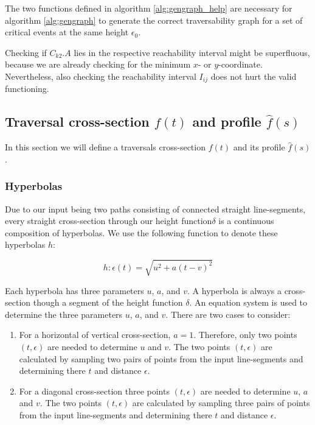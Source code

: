 The two functions defined in algorithm \ref{alg:gengraph_help} are necessary for algorithm \ref{alg:gengraph} to generate the correct traversability graph for a set of critical events at the same height $\epsilon_0$.

Checking if $C_{k2}.A$ lies in the respective reachability interval might be superfluous, because we are already checking for the minimum $x$- or $y$-coordinate. Nevertheless, also checking the reachability interval $I_{ij}$ does not hurt the valid functioning.


\subsection{Traversal cross-section $f(t)$ and profile $\hat{f}(s)$}\label{sec:trav_csp}

In this section we will define a traversals cross-section $f(t)$ and its profile $\hat{f}(s)$.

\subsubsection{Hyperbolas}

Due to our input being two paths consisting of connected straight line-segments, every straight cross-section through our height function$\delta$ is a continuous composition of hyperbolas. We use the following function to denote these hyperbolas $h$:

$$h: \epsilon(t) = \sqrt{u^2 + a(t - v)^2}$$

Each hyperbola has three parameters $u$, $a$, and $v$. A hyperbola is always a cross-section though a segment of the height function $\delta$. An equation system is used to determine the three parameters $u$, $a$, and $v$. There are two cases to consider:

\begin{enumerate}
	\item For a horizontal of vertical cross-section, $a = 1$. Therefore, only two points $(t, \epsilon)$ are needed to determine $u$ and $v$. The two points $(t, \epsilon)$ are calculated by sampling two pairs of points from the input line-segments and determining there $t$ and distance $\epsilon$.
	\item For a diagonal cross-section three points $(t, \epsilon)$ are needed to determine $u$, $a$ and $v$. The two points $(t, \epsilon)$ are calculated by sampling three pairs of points from the input line-segments and determining there $t$ and distance $\epsilon$.
\end{enumerate}

